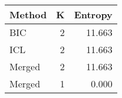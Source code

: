 \begin{center} 
\begin{tabular}{lrr}
 Method & K & Entropy \\ 
  \hline
\hline
BIC &    2 & 11.663 \\ 
  ICL &    2 & 11.663 \\ 
  Merged &    2 & 11.663 \\ 
  Merged &    1 & 0.000 \\ 
  \end{tabular}
\end{center} 
